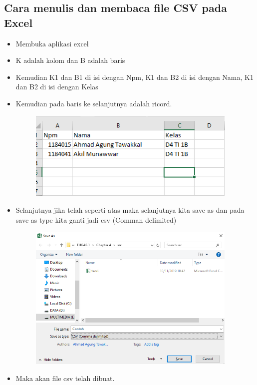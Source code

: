 \documentclass{article}
\begin{document}
    \subsection{Cara menulis dan membaca file CSV pada Excel}
        \begin{itemize}
            \item Membuka aplikasi excel
            \item K adalah kolom dan B adalah baris
            \item Kemudian K1 dan B1 di isi dengan Npm, K1 dan B2 di isi dengan Nama, K1 dan B2 di isi dengan Kelas
            \item Kemudian pada baris ke selanjutnya adalah ricord.
            \begin{figure}[ht]
                \centerline{\includegraphics[width=10cm]{Capture.PNG}}
            \end{figure}
            \item Selanjutnya jika telah seperti atas maka selanjutnya kita save as dan pada save as type kita ganti jadi csv (Comman delimited)
            \newpage
            \begin{figure}[ht]
                \centerline{\includegraphics[width=10cm]{Capture1.PNG}}
            \end{figure}
            \item Maka akan file csv telah dibuat.
        \end{itemize}
    
\end{document}
